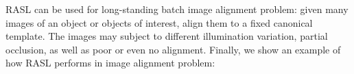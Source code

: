 RASL can be used for long-standing batch image alignment problem: given many images of an object or objects of interest, align them to a fixed canonical template. The images may subject to different illumination variation, partial occlusion, as well as poor or even no alignment. Finally, we show an example of how RASL performs in image alignment problem:

\begin{figure}[h!]
  \centering
  ~ 
  ~ 
  \\ 

\end{figure}
